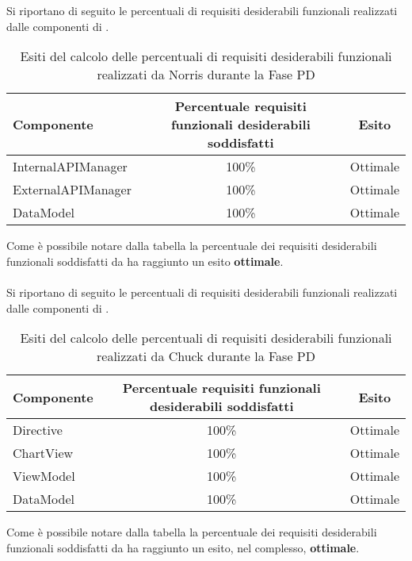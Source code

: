 					Si riportano di seguito le percentuali di requisiti desiderabili funzionali realizzati dalle componenti di .
					\begin{table}[H]
						\centering
							\begin{tabu}{| l | c | c |}
								\hline
								Componente			& 	Percentuale requisiti funzionali desiderabili soddisfatti	& Esito		\\ \hline \hline
								InternalAPIManager	& 	100\% 	& Ottimale  \\ \hline
								ExternalAPIManager  & 	100\%	& Ottimale  \\ \hline
								DataModel  			& 	100\%	& Ottimale  \\ \hline
							\end{tabu}
						\caption{Esiti del calcolo delle percentuali di requisiti desiderabili funzionali realizzati da Norris durante la Fase PD}
					\end{table}
					Come è possibile notare dalla tabella la percentuale dei requisiti desiderabili funzionali soddisfatti da  ha raggiunto un esito \textbf{ottimale}. 
					\\ \\
					Si riportano di seguito le percentuali di requisiti desiderabili funzionali realizzati dalle componenti di \insglo{Chuck}.
					\begin{table}[H]
						\centering
							\begin{tabu}{| l | c | c |}
								\hline
								Componente	& Percentuale requisiti funzionali desiderabili soddisfatti	& Esito		\\ \hline \hline
								Directive	&	100\% 	& Ottimale  \\ \hline
								ChartView	& 	100\%	& Ottimale  \\ \hline
								ViewModel	& 	100\%	& Ottimale  \\ \hline
								DataModel	& 	100\%	& Ottimale  	\\ \hline
							\end{tabu}
						\caption{Esiti del calcolo delle percentuali di requisiti desiderabili funzionali realizzati da Chuck durante la Fase PD}
					\end{table}
					Come è possibile notare dalla tabella la percentuale dei requisiti desiderabili funzionali soddisfatti da  ha raggiunto un esito, nel complesso, \textbf{ottimale}.


